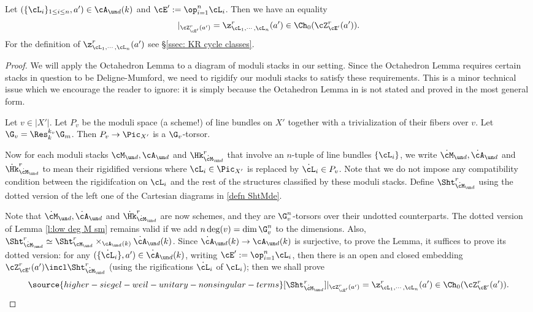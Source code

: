 \begin{lemma}
\notready\label{l:M und KR} Let  $(\{\cL_{i}\}_{1\le i\le n}, a')\in \cA_{\un d}(k)$ and $\cE':=\op_{i=1}^{n}\cL_{i}$.  Then we have an equality
\begin{equation}
[\Sht^{r}_{\cM_{\un d}}]|_{\cZ^r_{\cE'}(a')}= \z^r_{\cL_{1},\cdots, \cL_{n}}(a')\in \Ch_{0}(\cZ^r_{\cE'}(a')).
\end{equation}
For the definition of $\z^r_{\cL_{1},\cdots, \cL_{n}}(a')$ see \S\ref{ssec: KR cycle classes}.
\end{lemma}
\begin{proof}
We will apply the Octahedron Lemma \cite[Theorem A.10]{YZ} to a diagram of moduli stacks in our setting. Since the Octahedron Lemma requires certain stacks in question to be Deligne-Mumford, we need to rigidify our moduli stacks to satisfy these requirements. This is a minor technical issue which we encourage the reader to ignore: it is simply because the Octahedron Lemma in \cite{YZ} is not stated and proved in the most general form.




Let $v\in |X'|$. Let $P_{v}$ be the moduli space (a scheme!) of line bundles on $X'$ together with a trivialization of their fibers over $v$. Let $\G_{v}=\Res^{k_{v}}_{k}\G_{m}$. Then $P_{v}\to\Pic_{X'}$ is a $\G_{v}$-torsor.

Now for each moduli stacks $\cM_{\un d}, \cA_{\un d}$ and $\Hk^{r}_{\dot\cM_{\un d}}$ that involve an $n$-tuple of line bundles $\{\cL_{i}\}$, we write  $\dot\cM_{\un d}, \dot\cA_{\un d}$ and $\dot\Hk^{r}_{\dot\cM_{\un d}}$ to mean their rigidified versions where $\cL_{i}\in\Pic_{X'}$ is  replaced by $\dot\cL_{i}\in P_{v}$. Note that we do not impose any compatibility condition between the rigidifcation on $\cL_{i}$ and the rest of the structures classified by these moduli stacks. Define $\Sht^{r}_{\dot\cM_{\un d}}$ using the dotted version of the left one of the Cartesian diagrams in  \eqref{defn ShtMde}.

Note that $\dot\cM_{\un d}, \dot\cA_{\un d}$ and $\dot\Hk^{r}_{\dot\cM_{\un d}}$ are now schemes, and they are $\G_{v}^{n}$-torsors over their undotted counterparts. The dotted version of Lemma \ref{l:low deg M sm} remains valid if we add $n\deg(v)=\dim\G_{v}^{n}$ to the dimensions.  Also, $\Sht^{r}_{\dot\cM_{\un d}}\simeq \Sht^{r}_{\cM_{\un d}}\times_{\cA_{\un d}(k)}\dot\cA_{\un d}(k)$.  Since $\dot\cA_{\un d}(k)\to\cA_{\un d}(k)$ is surjective, to prove the Lemma, it suffices to prove its dotted version: for any $(\{\dot\cL_{i}\}, a')\in \dot\cA_{\un d}(k)$, writing $\cE':=\op_{i=1}^{n}\cL_{i}$, then there is an open and closed embedding $\cZ^r_{\cE'}(a')\incl \Sht^{r}_{\dot\cM_{\un d}}$ (using the rigifications $\dot\cL_{i}$ of $\cL_{i}$); then we shall prove
\begin{equation}\label{dot cycle eqn}
\source{higher-siegel-weil-unitary-nonsingular-terms}
[\Sht^{r}_{\dot\cM_{\un d}}]|_{\cZ^r_{\cE'}(a')}=\z^r_{\cL_{1},\cdots, \cL_{n}}(a')\in \Ch_{0}(\cZ^r_{\cE'}(a')).
\end{equation}




\end{proof}
